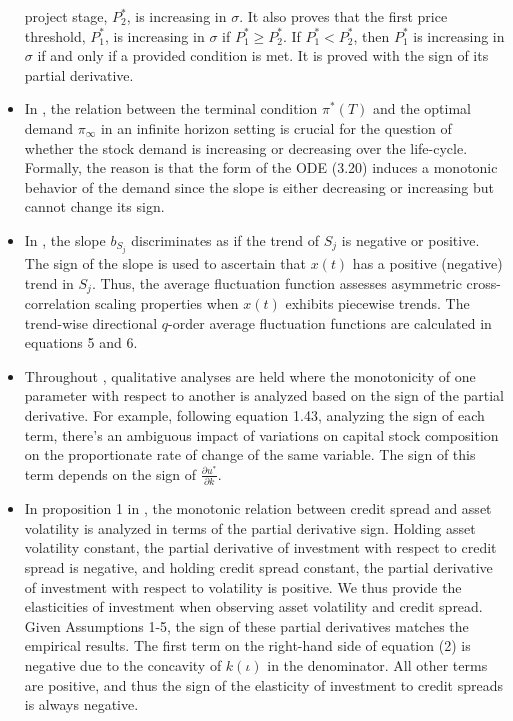 \documentclass[11pt]{book}
\begin{document}
\begin{itemize}
project stage, $P_{2}^{\ast}$, is increasing in $\sigma$. It also
proves that the first price threshold, $P_{1}^{\ast}$, is increasing
in $\sigma$ if $P_{1}^{\ast}\geq P_{2}^{\ast}$. If $P_{1}^{\ast}<P_{2}^{\ast}$,
then $P_{1}^{\ast}$ is increasing in $\sigma$ if and only if a provided
condition is met. It is proved with the sign of its partial derivative.
\item In \cite{kraft2019consumption},
the relation between the terminal condition $\pi^{\ast}\left(T\right)$
and the optimal demand $\pi_{\infty}$ in an infinite horizon setting
is crucial for the question of whether the stock demand is increasing
or decreasing over the life-cycle. Formally, the reason is that the
form of the ODE (3.20) induces a monotonic behavior of the demand
since the slope is either decreasing or increasing but cannot change
its sign.
\item In \cite{shahzad2020clean},
the slope $b_{S_{j}}$ discriminates as if the trend of $S_{j}$ is
negative or positive. The sign of the slope is used to ascertain that
$x\left(t\right)$ has a positive (negative) trend in $S_{j}$. Thus,
the average fluctuation function assesses asymmetric cross-correlation
scaling properties when $x\left(t\right)$ exhibits piecewise trends.
The trend-wise directional $q$-order average fluctuation functions
are calculated in equations 5 and 6.
\item Throughout \cite{cicerothree},
qualitative analyses are held where the monotonicity of one parameter
with respect to another is analyzed based on the sign of the partial
derivative. For example, following equation 1.43, analyzing the sign
of each term, there's an ambiguous impact of variations on capital
stock composition on the proportionate rate of change of the same
variable. The sign of this term depends on the sign of $\frac{\partial u^{*}}{\partial k}$.
\item In proposition 1 in \cite{chang2021bonds},
the monotonic relation between credit spread and asset volatility
is analyzed in terms of the partial derivative sign. Holding asset
volatility constant, the partial derivative of investment with respect
to credit spread is negative, and holding credit spread constant,
the partial derivative of investment with respect to volatility is
positive. We thus provide the elasticities of investment when observing
asset volatility and credit spread. Given Assumptions 1-5, the sign
of these partial derivatives matches the empirical results. The first
term on the right-hand side of equation (2) is negative due to the
concavity of $k\left(\iota\right)$ in the denominator. All other
terms are positive, and thus the sign of the elasticity of investment
to credit spreads is always negative.
\end{itemize}
\end{document}
